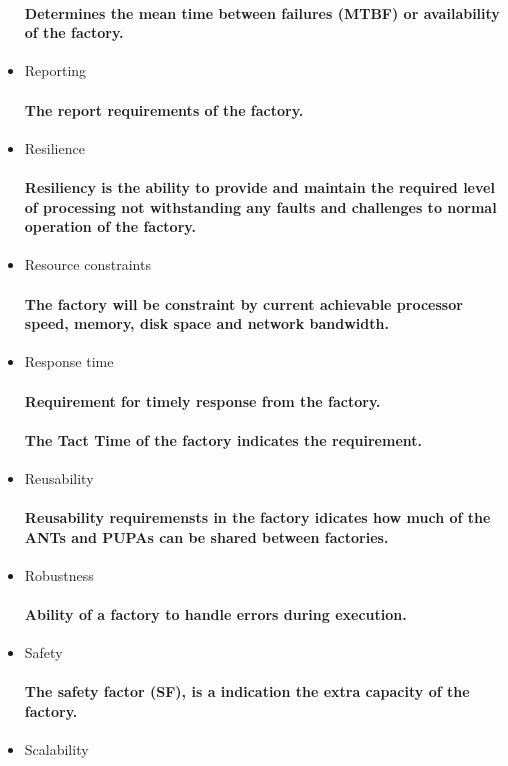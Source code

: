 \documentclass{acm_proc_article-sp}
\begin{document}
\begin{itemize}
\paragraph{Determines the mean time between failures (MTBF) or availability of the factory.}
\item Reporting
\paragraph{The report requirements of the factory.}
\item Resilience
\paragraph{Resiliency is the ability to provide and maintain the required level of processing not withstanding any faults and challenges to normal operation of the factory.}
\item Resource constraints
\paragraph{The factory will be constraint by current achievable processor speed, memory, disk space and network bandwidth.}
\item Response time
\paragraph{Requirement for timely response from the factory.}
\paragraph{The Tact Time of the factory indicates the requirement.}
\item Reusability
\paragraph{Reusability requiremensts in the factory idicates how much of the ANTs and PUPAs can be shared between factories.}
\item Robustness
\paragraph{Ability of a factory to handle errors during execution.}
\item Safety
\paragraph{The safety factor (SF), is a indication the extra capacity of the factory.}
\item Scalability

\end{itemize}
\end{document}
